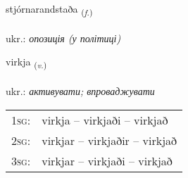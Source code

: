 \documentclass[frontgrid, backgrid]{flacards}\usepackage[]{graphicx}\usepackage[]{xcolor}
\begin{document}
\renewcommand{\blhead}{\vskip5pt {\small\bfseries\footnotesize Nafnorð | іменник }}
\renewcommand{\bcfoot}{\vskip5pt \hspace{2pt}{\small\bfseries\footnotesize 3K}}


{stjórnarandstaða \small{\textsubscript{(\textit{f.})}} \\[1ex] %
\textphonetic{[stjourtnarantstaða]} \\
ukr.: \emph{опозиція (у політиці)} \\  [2ex]
\renewcommand*{\arraystretch}{0.8}
}

\renewcommand{\flhead}{\vskip5pt \fboxsep=0pt {\small\bfseries\footnotesize Sagnorð | дієслово}}
\renewcommand{\fcfoot}{\vskip5pt \fboxsep=0pt \hspace{2pt}{\small\bfseries\footnotesize 3K}}

\renewcommand{\blhead}{\vskip5pt {\small\bfseries\footnotesize Sagnorð | дієслово }}
\renewcommand{\bcfoot}{\vskip5pt \hspace{2pt}{\small\bfseries\footnotesize 3K}}


{virkja \small{\textsubscript{(\textit{v.})}} \\[1ex] %
\textphonetic{[vɪr̥ca]} \\
ukr.: \emph{активувати; впроваджувати} \\  [2ex]
\renewcommand*{\arraystretch}{0.8}
\begin{tabular}{p{1cm}l}
\textsc{1sg}: & virkja -- virkjaði -- virkjað \\ 
\textsc{2sg}: & virkjar -- virkjaðir -- virkjað \\ 
\textsc{3sg}: & virkjar -- virkjaði -- virkjað \\ 
\end{tabular}
}
\end{document}
